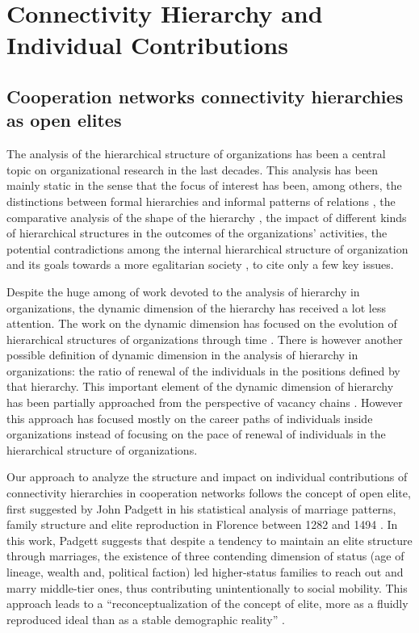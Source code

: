 \chapter{Connectivity Hierarchy and Individual Contributions}
\label{contributions}

\section{Cooperation networks connectivity hierarchies as open elites}

The analysis of the hierarchical structure of organizations has been a central topic on organizational research in the last decades. This analysis has been mainly static in the sense that the focus of interest has been, among others, the distinctions between formal hierarchies and informal patterns of relations \citep{krackhardt:1993, mcfarland:2001}, the comparative analysis of the shape of the hierarchy \citep{blau:1962,blau:1964}, the impact of different kinds of hierarchical structures in the outcomes of the organizations' activities, the potential contradictions among the internal hierarchical structure of organization and its goals towards a more egalitarian society \citep{michels:1915,selznick:1949}, to cite only a few key issues.

Despite the huge among of work devoted to the analysis of hierarchy in organizations, the dynamic dimension of the hierarchy has received a lot less attention. The work on the dynamic dimension has focused on the evolution of hierarchical structures of organizations through time \citep{blau:1969}. There is however another possible definition of dynamic dimension in the analysis of hierarchy in organizations: the ratio of renewal of the individuals in the positions defined by that hierarchy. This important element of the dynamic dimension of hierarchy has been partially approached from the perspective of vacancy chains \citep{white:1970,stewman:1983}. However this approach has focused mostly on the career paths of individuals inside organizations instead of focusing on the pace of renewal of individuals in the hierarchical structure of organizations.

Our approach to analyze the structure and impact on individual contributions of connectivity hierarchies in cooperation networks follows the concept of open elite, first suggested by John Padgett in his statistical analysis of marriage patterns, family structure and elite reproduction in Florence between 1282 and 1494 \citep{padgett:2010}. In this work, Padgett suggests that despite a tendency to maintain an elite structure through marriages, the existence of three contending dimension of status (age of lineage, wealth and, political faction) led higher-status families to reach out and marry middle-tier ones, thus contributing unintentionally to social mobility. This approach leads to a ``reconceptualization of the concept of elite, more as a fluidly reproduced ideal than as a stable demographic reality'' \citep[360]{padgett:2010}. 

